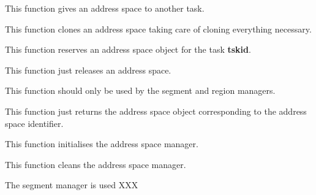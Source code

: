 
This function gives an address space to another task.


This function clones an address space taking care of cloning everything
necessary.


This function reserves an address space object for the task \textbf{tskid}.


This function just releases an address space.


This function should only be used by the segment and region managers.

This function just returns the address space object corresponding to
the address space identifier.


This function initialises the address space manager.


This function cleans the address space manager.

%
%

The segment manager is used XXX

%
%

%
%

%
%

%
%




